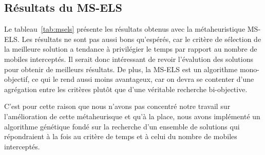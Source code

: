     	\subsection{Résultats du MS-ELS}
    	
    	Le tableau~\ref{tab:msels} présente les résultats obtenus avec la métaheuristique MS-ELS. Les résultats ne sont pas aussi bons qu'espérés, car le critère de sélection de la meilleure solution a tendance à privilégier le temps par rapport au nombre de mobiles interceptés. Il serait donc intéressant de revoir l'évalution des solutions pour obtenir de meilleurs résultats. De plus, la MS-ELS est un algorithme mono-objectif, ce qui le rend aussi moins avantageux, car on devra se contenter d'une agrégation entre les critères plutôt que d'une véritable recherche bi-objective.
    	
    C'est pour cette raison que nous n'avons pas concentré notre travail sur l'amélioration de cette métaheurisque et qu'à la place, nous avons implémenté un algorithme génétique fondé sur la recherche d'un ensemble de solutions qui répondraient à la fois au critère de temps et à celui du nombre de mobiles interceptés.
    	
